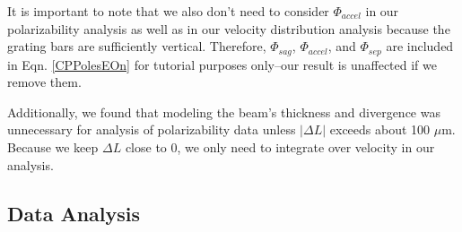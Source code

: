 \documentclass[twocolumn, prl,showpacs,superscriptaddress]{revtex4-1}   %
\newcommand{\eqnref}[1]{Eqn. \ref{#1}}
\begin{document}
It is important to note that we also don't need to consider $\Phi_{accel}$ in our polarizability analysis as well as in our velocity distribution analysis because the grating bars are sufficiently vertical. Therefore, $\Phi_{sag}$, $\Phi_{accel}$, and $\Phi_{sep}$ are included in \eqnref{CPPolesEOn} for tutorial purposes only--our result is unaffected if we remove them.

Additionally, we found that modeling the beam's thickness and divergence was unnecessary for analysis of polarizability data unless $|\Delta L|$ exceeds about 100 $\mu$m. Because we keep $\Delta L$ close to 0, we only need to integrate over velocity in our analysis.

\subsection{Data Analysis}
\end{document}
